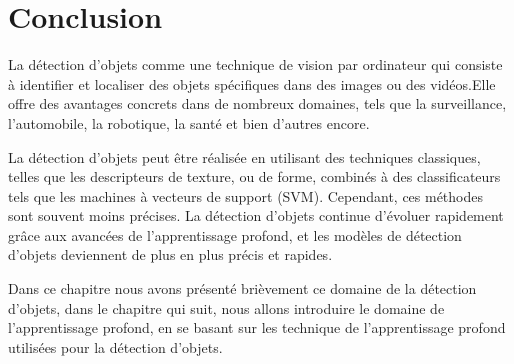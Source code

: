 \section{Conclusion}
La détection d'objets comme une technique de vision par ordinateur qui consiste à identifier et localiser des objets spécifiques dans des images ou des vidéos.Elle offre des avantages concrets dans de nombreux domaines, tels que la surveillance, l'automobile, la robotique, la santé et bien d'autres encore.

La détection d'objets peut  être réalisée en utilisant des techniques classiques, telles que les descripteurs de texture, ou de forme, combinés à des classificateurs tels que les machines à vecteurs de support (SVM). Cependant, ces méthodes sont souvent moins précises. 
La détection d'objets continue d'évoluer rapidement grâce aux avancées de l'apprentissage profond, et les modèles de détection d'objets deviennent de plus en plus précis et rapides.

Dans ce chapitre nous avons présenté brièvement ce domaine
de la détection d'objets, dans le chapitre qui suit, nous allons introduire le domaine de l'apprentissage profond, en se basant sur les technique de l'apprentissage profond utilisées pour la détection d'objets.


